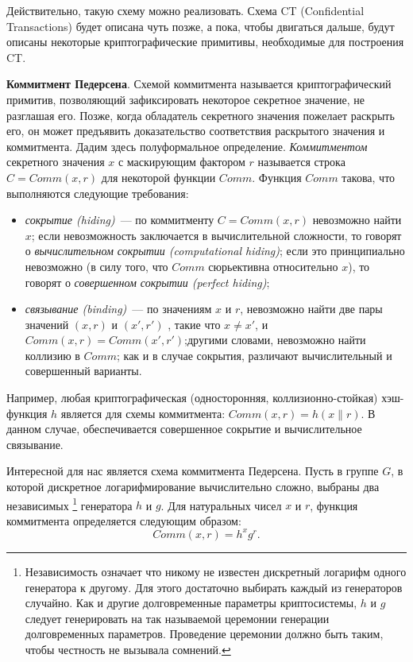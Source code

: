\documentclass{article}
\begin{document}
Действительно, такую схему можно реализовать. Схема CT (Confidential Transactions)
будет описана чуть позже, а пока, чтобы двигаться дальше,
будут описаны некоторые криптографические примитивы, необходимые для построения CT.

{\bf Коммитмент Педерсена}.
Схемой коммитмента называется криптографический примитив, позволяющий зафиксировать
некоторое секретное значение, не разглашая его.
Позже, когда обладатель секретного значения пожелает раскрыть его,
он может предъявить доказательство соответствия раскрытого значения и коммитмента.
Дадим здесь полуформальное определение.
\textit{Коммитментом} секретного значения $x$ с маскирующим фактором $r$
называется строка $C = Comm(x, r)$ для некоторой функции $Comm$.
Функция $Comm$ такова,
 что выполняются следующие требования:
\begin{itemize}
  \item
   \textit{сокрытие (hiding)}~--- по коммитменту $C = Comm(x,r)$ невозможно найти $x$;
   если невозможность заключается в вычислительной сложности, то говорят о
   \textit{вычислительном сокрытии (computational hiding)};
   если это принципиально невозможно (в силу того, что $Comm$ сюрьективна
   относительно $x$), то говорят о \textit{совершенном сокрытии (perfect hiding)};
  \item
  \textit{связывание (binding)}~--- по значениям $x$ и $r$,
  невозможно найти две пары значений $(x, r)$ и $(x', r')$ , такие что $x \neq x'$,
  и $Comm(x,r) = Comm(x', r')$;другими словами, невозможно найти коллизию в $Comm$;
  как и в случае сокрытия, различают вычислительный и совершенный варианты.
\end{itemize}

Например, любая криптографическая (односторонняя, коллизионно-стойкая) хэш-функция $h$
является для схемы коммитмента: $Comm(x, r) = h(x \parallel r)$. В данном случае,
обеспечивается совершенное сокрытие и вычислительное связывание.

Интересной для нас является схема коммитмента Педерсена.
Пусть в группе $G$, в которой дискретное логарифмирование вычислительно сложно,
 выбраны два независимых
\footnote{Независимость означает что никому не известен дискретный логарифм одного генератора к другому.
Для этого достаточно выбирать каждый из генераторов случайно.
Как и другие долговременные параметры криптосистемы,
$h$ и $g$ следует генерировать на так называемой церемонии генерации долговременных параметров.
Проведение церемонии должно быть таким, чтобы честность не вызывала сомнений.}
 генератора $h$ и $g$. Для натуральных чисел $x$ и $r$,
 функция коммитмента определяется следующим образом:
 $$
 Comm(x, r) = h^x g^r.
 $$
\end{document}
